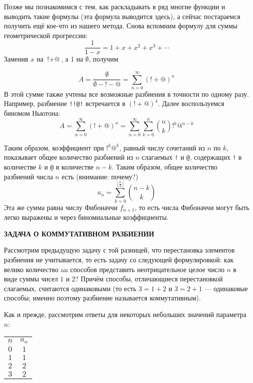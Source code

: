 \documentclass[12pt, letterpaper]{extarticle}
\begin{document}
Позже мы познакомимся с тем, как раскладывать в ряд многие функции и выводить такие формулы (эта формула выводится здесь), а сейчас постараемся получить ещё кое-что из нашего метода. Снова вспомним формулу для суммы геометрической прогрессии:
\[\frac{1}{1-x}=1+x+x^2+x^3+\cdots\]
Заменив $x$ на $\texttt{!}+\texttt{@}$, а 1 на $\emptyset$, получим

\[A=\frac{\emptyset}{\emptyset-\texttt{!}-\texttt{@}}=\sum_{n=0}^{\infty}(\texttt{!}+\texttt{@})^n\]
В этой сумме также учтены все возможные разбиения в точности по одному разу. Например, разбиение \texttt{!!@!} встречается в $(\texttt{!}+\texttt{@})^4$. Далее воспользуемся биномом Ньютона:
\[A=\sum_{n=0}^{\infty}(\texttt{!}+\texttt{@})^n=\sum_{n=0}^{\infty}\sum_{k=0}^{n}\binom{n}{k}\texttt{!}^k\texttt{@}^{n-k}\]

Таким образом, коэффициент при $\texttt{!}^k\texttt{@}^k$, равный числу сочетаний из $n$ по $k$, показывает общее количество разбиений из $n$ слагаемых \texttt{!} и \texttt{@}, содержащих \texttt{!} в количестве $k$ и \texttt{@} в количестве $n-k$. Таким образом, общее количество разбиений числа $n$ есть (внимание: почему?)
\[a_n=\sum_{k=0}^{\lfloor\frac{n}{2}\rfloor}\binom{n-k}{k}\]
Эта же сумма равна числу Фибоначчи $f_{n+1}$, то есть числа Фибоначчи могут быть легко выражены и через биномиальные коэффициенты.
\begin{center}
  \textbf{ЗАДАЧА О КОММУТАТИВНОМ РАЗБИЕНИИ}
\end{center}

Рассмотрим предыдущую задачу с той разницей, что перестановка элементов разбиения не учитывается, то есть задачу со следующей формулировкой: как велико количество an способов представить неотрицательное целое число $n$ в виде суммы чисел $1$ и $2$? Причём способы, отличающиеся перестановкой слагаемых, считаются одинаковыми (то есть $3=1+2$ и $3=2+1$ — одинаковые способы; именно поэтому разбиение называется коммутативным).

Как и прежде, рассмотрим ответы для некоторых небольших значений параметра $n$:
\begin{center}
\begin{tabular}{c c}
  $n$ & $a_n$ \\
  $0$ & $1$ \\
  $1$ & $1$ \\
  $2$ & $2$ \\
  $3$ & $2$
\end{tabular}
\end{center}
\end{document}
